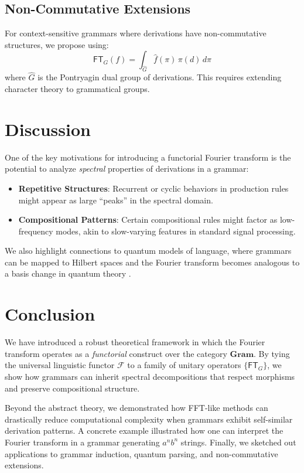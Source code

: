 \documentclass[11pt]{article}
\begin{document}
\subsection{Non-Commutative Extensions}
For context-sensitive grammars where derivations have non-commutative structures, we propose using:
\[
\mathsf{FT}_G(f) = \int_{\widehat{G}} \hat{f}(\pi) \,\pi(d) \,d\pi
\]
where \( \widehat{G} \) is the Pontryagin dual group of derivations. This requires extending character theory to grammatical groups.

\section{Discussion}

One of the key motivations for introducing a functorial Fourier transform is the potential to analyze \emph{spectral} properties of derivations in a grammar:
\begin{itemize}
    \item \textbf{Repetitive Structures}: Recurrent or cyclic behaviors in production rules might appear as large ``peaks'' in the spectral domain.
    \item \textbf{Compositional Patterns}: Certain compositional rules might factor as low-frequency modes, akin to slow-varying features in standard signal processing.
\end{itemize}

We also highlight connections to quantum models of language, where grammars can be mapped to Hilbert spaces and the Fourier transform becomes analogous to a basis change in quantum theory \cite{abramskyCoecke}.

\section{Conclusion}

We have introduced a robust theoretical framework in which the Fourier transform operates as a \emph{functorial} construct over the category \(\mathbf{Gram}\). By tying the universal linguistic functor \(\mathcal{F}\) to a family of unitary operators \(\{\mathsf{FT}_G\}\), we show how grammars can inherit spectral decompositions that respect morphisms and preserve compositional structure. 

Beyond the abstract theory, we demonstrated how FFT-like methods can drastically reduce computational complexity when grammars exhibit self-similar derivation patterns. A concrete example illustrated how one can interpret the Fourier transform in a grammar generating \(a^n b^n\) strings. Finally, we sketched out applications to grammar induction, quantum parsing, and non-commutative extensions.
\end{document}
